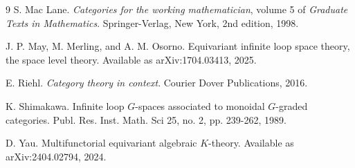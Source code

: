 \documentclass[openany, amssymb, psamsfonts]{amsart}
\theoremstyle{definition}
\numberwithin{equation}{section}
\begin{document}
\begin{thebibliography}{9}
S. Mac Lane.
\emph{Categories for the working mathematician}, volume 5 of \emph{Graduate Texts in Mathematics}. Springer-Verlag, New York, 2nd edition, 1998.

J. P. May, M. Merling, and A. M. Osorno.
Equivariant infinite loop space theory, the space level theory.
Available as arXiv:1704.03413, 2025.

E. Riehl.
\emph{Category theory in context}. Courier Dover Publications, 2016.

K. Shimakawa. 
Infinite loop $G$-spaces associated to monoidal $G$-graded categories.
Publ. Res. Inst. Math. Sci 25, no. 2, pp. 239-262, 1989.

D. Yau. Multifunctorial equivariant algebraic $K$-theory. Available as arXiv:2404.02794, 2024.

\end{thebibliography}
\end{document}
